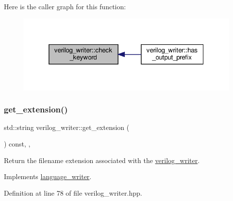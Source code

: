 Here is the caller graph for this function\+:
\nopagebreak
\begin{figure}[H]
\begin{center}
\leavevmode
\includegraphics[width=319pt]{d8/dba/classverilog__writer_a1595f62191efb28fa23d944791bbdd71_icgraph}
\end{center}
\end{figure}
\mbox{\label{classverilog__writer_a4dade87869d04a1a2b166efa8c0a2253}} 
\subsubsection{\texorpdfstring{get\+\_\+extension()}{get\_extension()}}
{\footnotesize\ttfamily std\+::string verilog\+\_\+writer\+::get\+\_\+extension (\begin{DoxyParamCaption}{ }\end{DoxyParamCaption}) const\hspace{0.3cm}{\ttfamily [inline]}, {\ttfamily [override]}, {\ttfamily [virtual]}}



Return the filename extension associated with the \hyperlink{classverilog__writer}{verilog\+\_\+writer}. 



Implements \hyperlink{classlanguage__writer_a3bcb9c84b283d53ecc1f3c4ee8e9dc38}{language\+\_\+writer}.



Definition at line 78 of file verilog\+\_\+writer.\+hpp.



